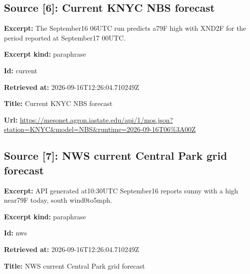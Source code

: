 \documentclass[11pt]{article}
\begin{document}
\subsection*{\textcolor{epdarkgreen}{Source [6]: Current KNYC NBS forecast}}
\par\noindent\textbf{Excerpt:} The September16 06UTC run predicts a79F high with XND2F for the period reported at September17 00UTC.

\par\noindent\textbf{Excerpt kind:} paraphrase

\par\noindent\textbf{Id:} current

\par\noindent\textbf{Retrieved at:} 2026-09-16T12:26:04.710249Z

\par\noindent\textbf{Title:} Current KNYC NBS forecast

\par\noindent\textbf{Url:} \href{https://mesonet.agron.iastate.edu/api/1/mos.json?station=KNYC\&model=NBS\&runtime=2026-09-16T06\%3A00Z}{https://meso\hspace{0pt}net.agron.ia\hspace{0pt}state.edu/ap\hspace{0pt}i/1/mos.json\hspace{0pt}?station=KNY\hspace{0pt}C\&model=NBS\&\hspace{0pt}runtime=2026\hspace{0pt}-09-16T06\%3A\hspace{0pt}00Z}

\subsection*{\textcolor{epdarkgreen}{Source [7]: NWS current Central Park grid forecast}}
\par\noindent\textbf{Excerpt:} API generated at10:30UTC September16 reports sunny with a high near79F today, south wind0to5mph.

\par\noindent\textbf{Excerpt kind:} paraphrase

\par\noindent\textbf{Id:} nws

\par\noindent\textbf{Retrieved at:} 2026-09-16T12:26:04.710249Z

\par\noindent\textbf{Title:} NWS current Central Park grid forecast
\end{document}
